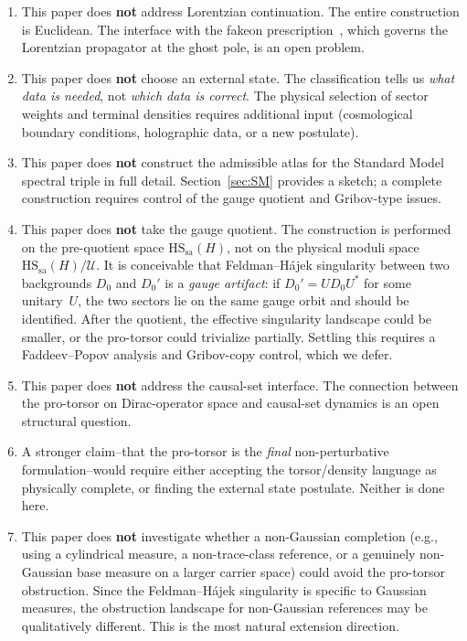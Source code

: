 \documentclass[12pt,a4paper]{article}
\theoremstyle{plain}
\theoremstyle{definition}
\theoremstyle{remark}
\newcommand{\HS}{\mathrm{HS}}
\newcommand{\sa}{\mathrm{sa}}
\begin{document}
\begin{enumerate}[leftmargin=2em]
  \item This paper does \textbf{not} address Lorentzian continuation.
    The entire construction is Euclidean.  The interface with the
    fakeon prescription~\cite{Anselmi:2018,Anselmi:2020}, which
    governs the Lorentzian propagator at the ghost pole, is an open
    problem.

  \item This paper does \textbf{not} choose an external state.  The
    classification tells us \emph{what data is needed}, not \emph{which
    data is correct}.  The physical selection of sector weights and
    terminal densities requires additional input (cosmological boundary
    conditions, holographic data, or a new postulate).

  \item This paper does \textbf{not} construct the admissible atlas
    for the Standard Model spectral triple in full detail.
    Section~\ref{sec:SM} provides a sketch; a complete construction
    requires control of the gauge quotient and Gribov-type issues.

  \item This paper does \textbf{not} take the gauge quotient.
    The construction is performed on the pre-quotient space
    $\HS_\sa(H)$, not on the physical moduli space
    $\HS_\sa(H)/\mathcal{U}$.  It is conceivable that
    Feldman--H\'ajek singularity between two backgrounds $D_0$ and
    $D_0'$ is a \emph{gauge artifact}: if $D_0'= U D_0 U^*$ for some
    unitary~$U$, the two sectors lie on the same gauge orbit and
    should be identified.  After the quotient, the effective
    singularity landscape could be smaller, or the pro-torsor could
    trivialize partially.  Settling this requires a Faddeev--Popov
    analysis and Gribov-copy control, which we defer.

  \item This paper does \textbf{not} address the causal-set interface.
    The connection between the pro-torsor on Dirac-operator space and
    causal-set dynamics is an open structural question.

  \item A stronger claim--that the pro-torsor is the \emph{final}
    non-perturbative formulation--would require either accepting the
    torsor/density language as physically complete, or finding the
    external state postulate.  Neither is done here.

  \item This paper does \textbf{not} investigate whether a
    non-Gaussian completion (e.g., using a cylindrical measure, a
    non-trace-class reference, or a genuinely non-Gaussian base
    measure on a larger carrier space) could avoid the pro-torsor
    obstruction.  Since the Feldman--H\'ajek singularity is specific
    to Gaussian measures, the obstruction landscape for non-Gaussian
    references may be qualitatively different.  This is the most
    natural extension direction.


\end{enumerate}
\end{document}
